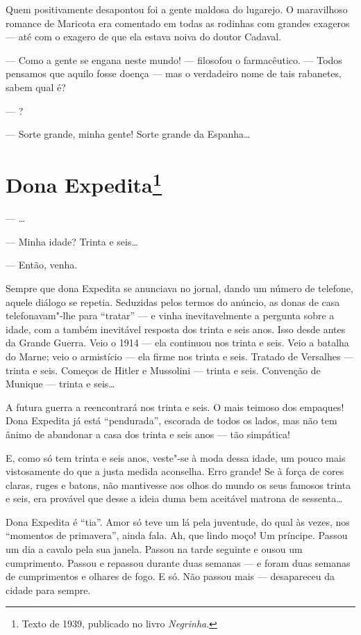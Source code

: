 Quem positivamente desapontou foi a gente maldosa do lugarejo. O
maravilhoso romance de Maricota era comentado em todas as rodinhas com
grandes exageros --- até com o exagero de que ela estava noiva do doutor
Cadaval.

--- Como a gente se engana neste mundo! --- filosofou o farmacêutico.
--- Todos pensamos que aquilo fosse doença --- mas o verdadeiro nome de
tais rabanetes, sabem qual é?

--- ?

--- Sorte grande, minha gente! Sorte grande da Espanha\ldots{}

\chapter{Dona Expedita\footnote[*]{Texto de 1939, publicado no livro \emph{Negrinha}.}}

--- \ldots{}

--- Minha idade? Trinta e seis\ldots{}

--- Então, venha.

Sempre que dona Expedita se anunciava no jornal, dando um número de
telefone, aquele diálogo se repetia. Seduzidas pelos termos do anúncio,
as donas de casa telefonavam"-lhe para ``tratar'' --- e vinha
inevitavelmente a pergunta sobre a idade, com a também inevitável
resposta dos trinta e seis anos. Isso desde antes da Grande Guerra. Veio
o 1914 --- ela continuou nos trinta e seis. Veio a batalha do Marne;
veio o armistício --- ela firme nos trinta e seis. Tratado de Versalhes
--- trinta e seis. Começos de Hitler e Mussolini --- trinta e seis.
Convenção de Munique --- trinta e seis\ldots{}

A futura guerra a reencontrará nos trinta e seis. O mais teimoso dos
empaques! Dona Expedita já está ``pendurada'', escorada de todos os
lados, mas não tem ânimo de abandonar a casa dos trinta e seis anos ---
tão simpática!

E, como só tem trinta e seis anos, veste"-se à moda dessa idade, um pouco
mais vistosamente do que a justa medida aconselha. Erro grande! Se à
força de cores claras, ruges e batons, não mantivesse aos olhos do mundo
os seus famosos trinta e seis, era provável que desse a ideia duma bem
aceitável matrona de sessenta\ldots{}

Dona Expedita é ``tia''. Amor só teve um lá pela juventude, do qual às
vezes, nos ``momentos de primavera'', ainda fala. Ah, que lindo moço! Um
príncipe. Passou um dia a cavalo pela sua janela. Passou na tarde
seguinte e ousou um cumprimento. Passou e repassou durante duas semanas
--- e foram duas semanas de cumprimentos e olhares de fogo. E só. Não
passou mais --- desapareceu da cidade para sempre.


